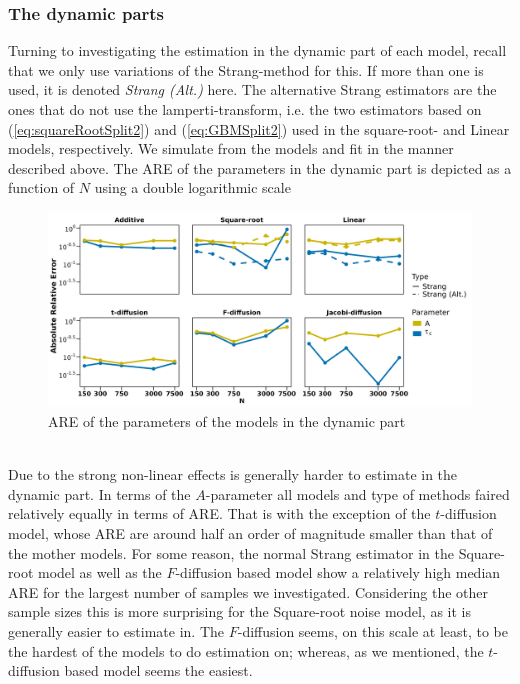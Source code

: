 \subsubsection{The dynamic parts}
Turning to investigating the estimation in the dynamic part of each model, recall that we only use variations of the Strang-method for this. If more than one is used, it is denoted \textit{Strang (Alt.)} here. The alternative Strang estimators are the ones that do not use the lamperti-transform, i.e. the two estimators based on (\ref{eq:squareRootSplit2}) and (\ref{eq:GBMSplit2}) used in the square-root- and Linear models, respectively. We simulate from the models and fit in the manner described above. The ARE of the parameters in the dynamic part is depicted as a function of $N$ using a double logarithmic scale 
\begin{figure}[h!]
    \begin{center}
    \includegraphics[scale = .1]{figures/parameter_precision_dynamic.jpeg}
    \caption{ARE of the parameters of the models in the dynamic part}
    \label{figure:parameter_precision_dynamic}        
\end{center}
\end{figure}\\
Due to the strong non-linear effects is generally harder to estimate in the dynamic part. In terms of the $A$-parameter all models and type of methods faired relatively equally in terms of ARE. That is with the exception of the $t$-diffusion model, whose ARE are around half an order of magnitude smaller than that of the mother models. For some reason, the normal Strang estimator in the Square-root model as well as the $F$-diffusion based model show a relatively high median ARE for the largest number of samples we investigated.  Considering the other sample sizes this is more surprising for the Square-root noise model, as it is generally easier to estimate in. The $F$-diffusion seems, on this scale at least, to be the hardest of the models to do estimation on; whereas, as we mentioned, the $t$-diffusion based model seems the easiest. 

